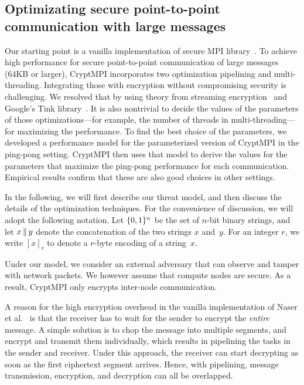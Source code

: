 \subsection{Optimizating secure point-to-point communication with large messages}

Our starting point is a vanilla implementation of secure MPI
library~\cite{Cluster:Naser19}. To achieve high performance for secure
point-to-point communication of large messages (64KB or larger),
CryptMPI incorporates two optimization
pipelining and multi-threading. Integrating those with encryption without
compromising security is challenging. We resolved that by using theory from
streaming encryption~\cite{C:HRRV15} and Google's Tink library~\cite{tink}.
It is also nontrivial to decide the values of the parameters of those
optimizations---for example, the number of threads in multi-threading---for
maximizing the performance. To find the best choice of the parameters, we
developed a performance model for the parameterized version of CryptMPI in the
ping-pong setting.
CryptMPI then uses that model to derive the values for the parameters that
maximize the ping-pong performance for each communication.
Empirical results confirm that these are also good choices in
other settings.

In the following, we will first describe our threat model,
and then discuss the details of the optimization techniques.
For the convenience of discussion,
we will adopt the following notation.
Let $\{0,1\}^n$ be the set of $n$-bit binary strings,
and let $x {\,\|\,} y$
denote the concatenation of the two strings $x$ and~$y$.
For an integer $r$, we write $[x]_r$ to denote a $r$-byte encoding
of a string~$x$.

Under our model, we consider an external
adversary that can observe and tamper with network packets.
We however assume that compute nodes are secure.
As a result, CryptMPI only encrypts inter-node communication.

A reason for the high encryption overhead in the vanilla
implementation of Naser et al.~\cite{Cluster:Naser19}
is that the receiver has to wait for the sender to
encrypt the \emph{entire} message. A simple solution is to chop the
message into multiple segments, and encrypt and transmit them individually, which
results in pipelining the tasks in  the sender and receiver.
Under this approach, the receiver can start decrypting as soon as the
first ciphertext segment arrives. Hence, with pipelining, message transmission,
encryption, and decryption can all be overlapped.

